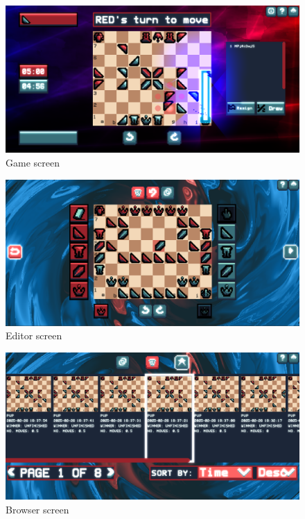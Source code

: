 \documentclass[../main/main.tex]{subfiles}
\begin{document}
\begin{figure}[H]
    \centering
    \includegraphics[width=\columnwidth]{../evaluation/assets/game.png}
    \caption{Game screen}
    \label{fig:evaluation-game}
\end{figure}

\begin{figure}[H]
    \centering
    \includegraphics[width=\columnwidth]{../evaluation/assets/editor.png}
    \caption{Editor screen}
    \label{fig:evaluation-editor}
\end{figure}

\begin{figure}[H]
    \centering
    \includegraphics[width=\columnwidth]{../evaluation/assets/browser.png}
    \caption{Browser screen}
    \label{fig:evaluation-browser}
\end{figure}
\end{document}
